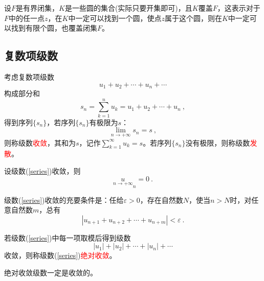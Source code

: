 \documentclass[11pt,a4paper]{article}
\begin{document}
\begin{tcolorbox}[colback=green!5,colframe=green!40!black,title= 覆盖定理]
设$F$是有界闭集，$K$是一些圆的集合(实际只要开集即可)，且$K$覆盖$F$，这表示对于$F$中的任一点$z$，在$K$中一定可以找到一个圆，使点$z$属于这个圆，则在$K$中一定可以找到有限个圆，也覆盖闭集$F$。
\end{tcolorbox}




\subsection{复数项级数}
\begin{tcolorbox}[colback=green!5,colframe=green!40!black,title= 定义]
考虑复数项级数
\begin{equation}
u_1 +u_2 +\cdots +u_n + \cdots
\label{series}
\end{equation}
构成部分和
\begin{equation}
s_n = \sum_{k=1}^n u_k = u_1 +u_2 +\cdots +u_n ~,
\end{equation}
得到序列$\{s_n\}$，若序列$\{s_n\}$有极限为$s$：
\begin{equation*}
\underset{n\rightarrow +\infty}\lim s_n = s ~,
\end{equation*}
则称级数\textcolor{red}{收敛}，其和为$s$，记作$\sum\limits_{k=1}^\infty u_k =s$。若序列$\{s_n\}$没有极限，则称级数\textcolor{red}{发散}。
\end{tcolorbox}


\begin{tcolorbox}[colback=green!5,colframe=green!40!black,title= 定理]
设级数(\ref{series})收敛，则
\begin{equation}
\underset{n\rightarrow +\infty} u_n = 0 ~.
\end{equation}
\end{tcolorbox}

\begin{tcolorbox}[colback=green!5,colframe=green!40!black,title= 定理]
级数(\ref{series})收敛的充要条件是：任给$\varepsilon > 0$，存在自然数$N$，使当$n > N$时，对任意自然数$m$，总有
\begin{equation}
|u_{n+1} +u_{n+2} +\cdots +u_{n+m}| <  \varepsilon ~.
\end{equation}
\end{tcolorbox}


\begin{tcolorbox}[colback=green!5,colframe=green!40!black,title= 定义]
若级数(\ref{series})中每一项取模后得到级数
\begin{equation}
|u_{1}| + |u_{2}| +\cdots +|u_{n}| +\cdots
\end{equation}
收敛，则称级数(\ref{series})\textcolor{red}{绝对收敛}。
\end{tcolorbox}
绝对收敛级数一定是收敛的。
\end{document}
